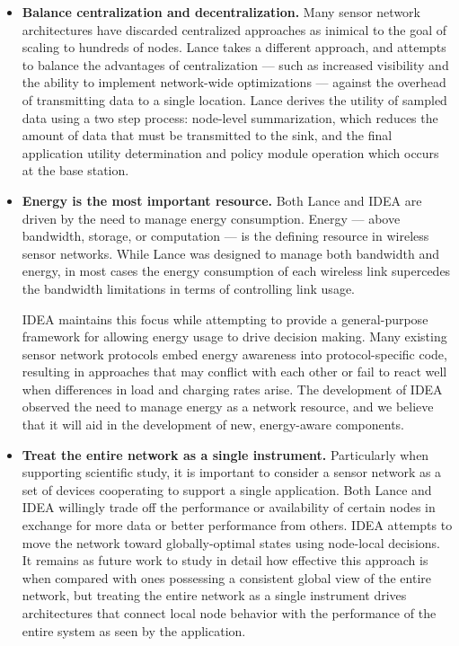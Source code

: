 \begin{itemize}

\item \textbf{Balance centralization and decentralization.} Many sensor
network architectures have discarded centralized approaches as inimical to
the goal of scaling to hundreds of nodes. Lance takes a different approach,
and attempts to balance the advantages of centralization --- such as
increased visibility and the ability to implement network-wide optimizations
--- against the overhead of transmitting data to a single location. Lance
derives the utility of sampled data using a two step process: node-level
summarization, which reduces the amount of data that must be transmitted to
the sink, and the final application utility determination and policy module
operation which occurs at the base station.

\item \textbf{Energy is the most important resource.} Both Lance and IDEA
are driven by the need to manage energy consumption. Energy --- above
bandwidth, storage, or computation --- is the defining resource in wireless
sensor networks. While Lance was designed to manage both bandwidth and
energy, in most cases the energy consumption of each wireless link supercedes
the bandwidth limitations in terms of controlling link usage.

IDEA maintains this focus while attempting to provide a general-purpose
framework for allowing energy usage to drive decision making. Many existing
sensor network protocols embed energy awareness into protocol-specific code,
resulting in approaches that may conflict with each other or fail to react
well when differences in load and charging rates arise. The development of
IDEA observed the need to manage energy as a network resource, and we believe
that it will aid in the development of new, energy-aware components.

\item \textbf{Treat the entire network as a single instrument.} Particularly
when supporting scientific study, it is important to consider a sensor
network as a set of devices cooperating to support a single application. Both
Lance and IDEA willingly trade off the performance or availability of certain
nodes in exchange for more data or better performance from others. IDEA
attempts to move the network toward globally-optimal states using node-local
decisions. It remains as future work to study in detail how effective this
approach is when compared with ones possessing a consistent global view of
the entire network, but treating the entire network as a single instrument
drives architectures that connect local node behavior with the performance of
the entire system as seen by the application.

\end{itemize}


